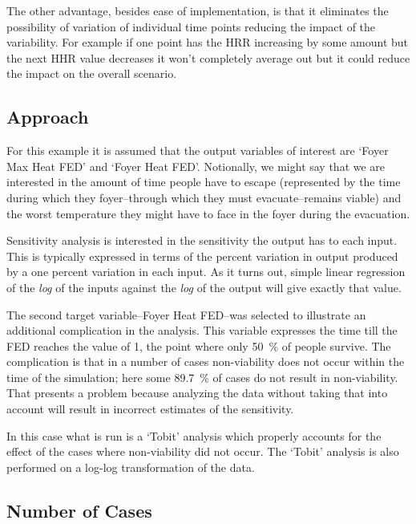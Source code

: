 \documentclass[12pt,twoside]{book}
\begin{document}
The other advantage, besides ease of implementation, is that it eliminates the possibility of variation of individual time points reducing the impact of the variability. For example if one point has the HRR increasing by some amount but the next HHR value decreases it won't completely average out but it could reduce the impact on the overall scenario.

\hypertarget{approach}{%
\subsection{Approach}\label{approach}}

For this example it is assumed that the output variables of interest are `Foyer Max Heat FED' and `Foyer Heat FED'. Notionally, we might say that we are interested in the amount of time people have to escape (represented by the time during which they foyer--through which they must evacuate--remains viable) and the worst temperature they might have to face in the foyer during the evacuation.

Sensitivity analysis is interested in the sensitivity the output has to each input. This is typically expressed in terms of the percent variation in output produced by a one percent variation in each input. As it turns out, simple linear regression of the \emph{log} of the inputs against the \emph{log} of the output will give exactly that value.

The second target variable--Foyer Heat FED--was selected to illustrate an additional complication in the analysis. This variable expresses the time till the FED reaches the value of 1, the point where only 50~\% of people survive. The complication is that in a number of cases non-viability does not occur within the time of the simulation; here some 89.7~\% of cases do not result in non-viability. That presents a problem because analyzing the data without taking that into account will result in incorrect estimates of the sensitivity.

In this case what is run is a `Tobit' analysis\cite{Tobin:1958} which properly accounts for the effect of the cases where non-viability did not occur. The `Tobit' analysis is also performed on a log-log transformation of the data.

\hypertarget{number-of-cases}{%
\subsection{Number of Cases}\label{number-of-cases}}
\end{document}
